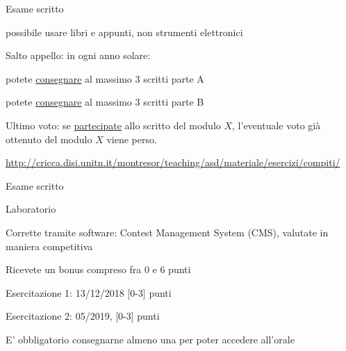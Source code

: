 \begin{frame}{Esame scritto}

\vspace{-9pt}
\begin{myboxtitle}
\BI
\item \EE possibile usare libri e appunti, non strumenti elettronici
\EI
\end{myboxtitle}

\begin{myboxtitle}[Regole]
\BI
\item \alert{Salto appello}: in ogni anno solare:
\BI
\item potete \underline{consegnare} al massimo \alert{3} scritti parte A
\item potete \underline{consegnare} al massimo \alert{3} scritti parte B
\EI
\item \alert{Ultimo voto}: se \underline{partecipate} allo scritto del modulo $X$, l'eventuale voto già ottenuto del modulo $X$ viene perso.
\EI
\end{myboxtitle}

\begin{myboxtitle}
\small
\url{http://cricca.disi.unitn.it/montresor/teaching/asd/materiale/esercizi/compiti/}
\end{myboxtitle}

\end{frame}
\begin{frame}{Esame scritto}
\vspace{-18pt}
\end{frame}
\begin{frame}{Laboratorio}
	
\vspace{-9pt}
\BI
\item Corrette tramite software: Contest Management System (CMS), valutate in maniera competitiva
\item Ricevete un bonus compreso fra 0 e 6 punti
\BI
\item Esercitazione 1: 13/12/2018 [0-3] punti
\item Esercitazione 2: 05/2019, [0-3] punti
\EI
\item E' obbligatorio consegnarne almeno una per poter accedere all'orale 
\EI

\end{frame}

